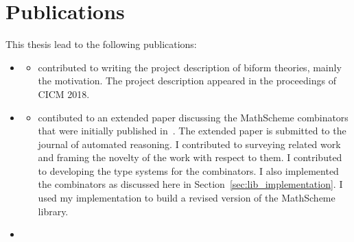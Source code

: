 \section{Publications}
This thesis lead to the following publications: 
\begin{itemize}
    \item \cite{biformCICM2018} 
        \begin{itemize}
        \item[] contributed to writing the project description of biform theories, mainly the motivation. The project description appeared in the proceedings of CICM 2018. 
        \end{itemize}
    \item \cite{carette2018building} 
    \begin{itemize} 
    \item[] contibuted to an extended paper discussing the MathScheme combinators that were initially published in~\cite{CaretteOConnorTPC}. The extended paper is submitted to the journal of automated reasoning. I contributed to surveying related work and framing the novelty of the work with respect to them. I contributed to developing the type systems for the combinators. I also implemented the combinators as discussed here in Section~\ref{sec:lib_implementation}. I used my implementation to build a revised version of the MathScheme library. 
   \end{itemize}
    \item ~\cite{diagrams_mmt} 

\end{itemize}
